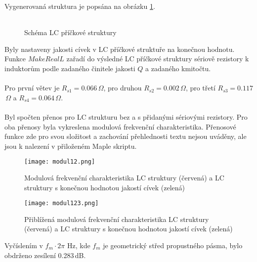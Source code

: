\noindent Vygenerovaná struktura je popsána na obrázku \ref{s:SCHEM}.\\
\\
\begin{figure}[h]
\centering
{}
\caption{Schéma LC příčkové struktury \label{s:SCHEM}}
\end{figure}
\noindent Byly nastaveny jakosti cívek v LC příčkové struktuře na konečnou hodnotu. Funkce $MakeRealL$ zařadí do výsledné LC příčkové struktury sériově rezistory k induktorům podle zadaného činitele jakosti $Q$ a zadaného kmitočtu.\\
\\
Pro první větev je $R_{s1} = 0.066$\,$\Omega$, pro druhou $R_{s2} = 0.002$\,$\Omega$, pro třetí $R_{s3} = 0.117$\,$\Omega$ a $R_{s4} = 0.064$\,$\Omega$.\\
\\
\noindent Byl spočten přenos pro LC strukturu bez a s přidanými sériovými rezistory. Pro oba přenosy byla vykreslena modulová frekvenční charakteristika. Přenosové funkce zde pro svou složitost a zachování přehlednosti textu nejsou uváděny, ale jsou k nalezení v přiloženém Maple skriptu.
\begin{figure}[H]
\centering
\texttt{[image: modul12.png]}
\caption[Modulová frekvenční charakteristika LC struktury a LC struktury s konečnou hodnotou jakostí cívek]{Modulová frekvenční charakteristika LC struktury (červená) a LC struktury s konečnou hodnotou jakostí cívek (zelená)}
\end{figure}
\begin{figure}[H]
\centering
\texttt{[image: modul123.png]}
\caption[Přiblížená modulová frekvenční charakteristika LC struktury a LC struktury s konečnou hodnotou jakostí cívek]{Přiblížená modulová frekvenční charakteristika LC struktury (červená) a LC struktury s konečnou hodnotou jakostí cívek (zelená)}
\end{figure}
\noindent Vyčíslením v $f_m \cdot 2 \pi$ Hz, kde $f_m$ je geometrický střed propustného pásma, bylo obdrženo zesílení 0.283\,dB.\\
\\
